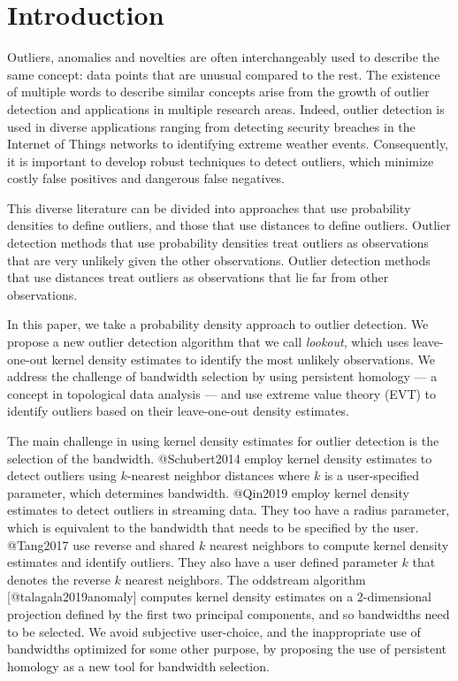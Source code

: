 \documentclass[
]{article}
\author{}
\date{\vspace{-2.5em}}
\begin{document}
\hypertarget{introduction}{%
\section{Introduction}\label{introduction}}

Outliers, anomalies and novelties are often interchangeably used to
describe the same concept: data points that are unusual compared to the
rest. The existence of multiple words to describe similar concepts arise
from the growth of outlier detection and applications in multiple
research areas. Indeed, outlier detection is used in diverse
applications ranging from detecting security breaches in the Internet of
Things networks to identifying extreme weather events. Consequently, it
is important to develop robust techniques to detect outliers, which
minimize costly false positives and dangerous false negatives.

This diverse literature can be divided into approaches that use
probability densities to define outliers, and those that use distances
to define outliers. Outlier detection methods that use probability
densities treat outliers as observations that are very unlikely given
the other observations. Outlier detection methods that use distances
treat outliers as observations that lie far from other observations.

In this paper, we take a probability density approach to outlier
detection. We propose a new outlier detection algorithm that we call
\emph{lookout}, which uses leave-one-out kernel density estimates to
identify the most unlikely observations. We address the challenge of
bandwidth selection by using persistent homology --- a concept in
topological data analysis --- and use extreme value theory (EVT) to
identify outliers based on their leave-one-out density estimates.

The main challenge in using kernel density estimates for outlier
detection is the selection of the bandwidth. @Schubert2014 employ kernel
density estimates to detect outliers using \(k\)-nearest neighbor
distances where \(k\) is a user-specified parameter, which determines
bandwidth. @Qin2019 employ kernel density estimates to detect outliers
in streaming data. They too have a radius parameter, which is equivalent
to the bandwidth that needs to be specified by the user. @Tang2017 use
reverse and shared \(k\) nearest neighbors to compute kernel density
estimates and identify outliers. They also have a user defined parameter
\(k\) that denotes the reverse \(k\) nearest neighbors. The oddstream
algorithm {[}@talagala2019anomaly{]} computes kernel density estimates
on a 2-dimensional projection defined by the first two principal
components, and so bandwidths need to be selected. We avoid subjective
user-choice, and the inappropriate use of bandwidths optimized for some
other purpose, by proposing the use of persistent homology as a new tool
for bandwidth selection.
\end{document}
